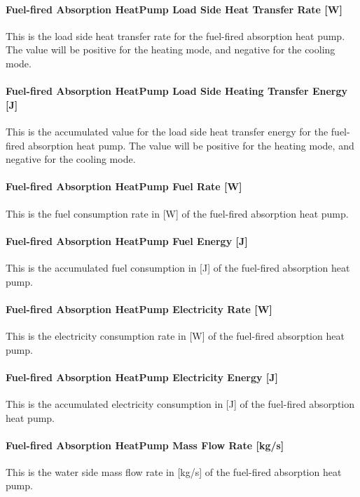 \paragraph{Fuel-fired Absorption HeatPump Load Side Heat Transfer Rate [W]}
This is the load side heat transfer rate for the fuel-fired absorption heat pump. The value will be positive for the heating mode, and negative for the cooling mode.

\paragraph{Fuel-fired Absorption HeatPump Load Side Heating Transfer Energy [J]}
This is the accumulated value for the load side heat transfer energy for the fuel-fired absorption heat pump. The value will be positive for the heating mode, and negative for the cooling mode.

\paragraph{Fuel-fired Absorption HeatPump Fuel Rate [W]}
This is the fuel consumption rate in [W] of the fuel-fired absorption heat pump. 

\paragraph{Fuel-fired Absorption HeatPump Fuel Energy [J]}
This is the accumulated fuel consumption in [J] of the fuel-fired absorption heat pump. 

\paragraph{Fuel-fired Absorption HeatPump Electricity Rate [W]}
This is the electricity consumption rate in [W] of the fuel-fired absorption heat pump.

\paragraph{Fuel-fired Absorption HeatPump Electricity Energy [J]}
This is the accumulated electricity consumption in [J] of the fuel-fired absorption heat pump.

\paragraph{Fuel-fired Absorption HeatPump Mass Flow Rate [kg/s]}
This is the water side mass flow rate in [kg/s] of the fuel-fired absorption heat pump.

